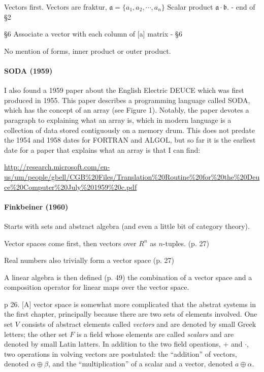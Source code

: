 Vectors first.
Vectors are fraktur, $\mathfrak a = \{a_1, a_2, \cdots, a_n\}$
Scalar product $\mathfrak a \cdot \mathfrak b$. - end of \S 2

\S6 Associate a vector with each column of [a] matrix - \S 6

No mention of forms, inner product or outer product.


\paragraph{SODA (1959)}

I also found a 1959 paper about the English Electric DEUCE which
was first produced in 1955. This paper describes a programming
language called SODA, which has the concept of an array (see Figure
1). Notably, the paper devotes a paragraph to explaining what an array
is, which in modern language is a collection of data stored
contiguously on a memory drum. This does not predate the 1954 and 1958
dates for FORTRAN and ALGOL, but so far it is the earliest date for a
paper that explains what an array is that I can find:

\url{http://research.microsoft.com/en-us/um/people/gbell/CGB%20Files/Translation%20Routine%20for%20the%20Deuce%20Computer%20July%201959%20c.pdf}


\paragraph{Finkbeiner (1960)~\cite{Finkbeiner1960}}

Starts with sets and abstract algebra (and even a little bit of category theory).

Vector spaces come first, then vectors over $R^n$ as $n$-tuples. (p. 27)

Real numbers also trivially form a vector space (p. 27)

A linear algebra is then defined (p. 49) the combination of a vector space and a composition operator for linear maps over the vector space.

p 26. [A] vector space is somewhat more complicated that the abstrat systems in the first chapter, principally because there are two sets of elements involved. One set $V$ consists of abstract elements called \textit{vectors} and are denoted by small Greek letters; the other set $F$ is a field whose elements are called \textit{scalars} and are denoted by small Latin latters. In addition to the two field opeations, $+$ and $\cdot$, two operations in volving vectors are postulated: the ``addition'' of vectors, denoted $\alpha \oplus \beta$, and the ``multiplication'' of a scalar and a vector, denoted $a \oplus \alpha$.


